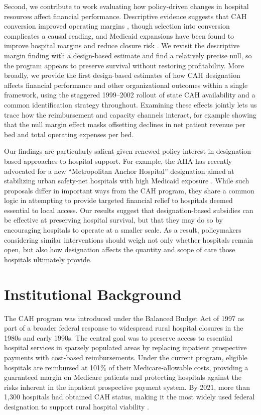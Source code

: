 \documentclass[a4paper, 12pt, twoside]{article}
\begin{document}
Second, we contribute to work evaluating how policy-driven changes in hospital resources affect financial performance. Descriptive evidence suggests that CAH conversion improved operating margins \citep{stensland2003, li2009}, though selection into conversion complicates a causal reading, and Medicaid expansions have been found to improve hospital margins and reduce closure risk \citep{blavin2016, lindrooth2018, blavin2021}. We revisit the descriptive margin finding with a design-based estimate and find a relatively precise null, so the program appears to preserve survival without restoring profitability. More broadly, we provide the first design-based estimates of how CAH designation affects financial performance and other organizational outcomes within a single framework, using the staggered 1999--2002 rollout of state CAH availability and a common identification strategy throughout. Examining these effects jointly lets us trace how the reimbursement and capacity channels interact, for example showing that the null margin effect masks offsetting declines in net patient revenue per bed and total operating expenses per bed.

Our findings are particularly salient given renewed policy interest in designation-based approaches to hospital support. For example, the AHA has recently advocated for a new ``Metropolitan Anchor Hospital'' designation aimed at stabilizing urban safety-net hospitals with high Medicaid exposure \citep{hartzman2022}. While such proposals differ in important ways from the CAH program, they share a common logic in attempting to provide targeted financial relief to hospitals deemed essential to local access. Our results suggest that designation-based subsidies can be effective at preserving hospital survival, but that they may do so by encouraging hospitals to operate at a smaller scale. As a result, policymakers considering similar interventions should weigh not only whether hospitals remain open, but also how designation affects the quantity and scope of care those hospitals ultimately provide.

\section{Institutional Background}
\label{sec:background}

The CAH program was introduced under the Balanced Budget Act of 1997 as part of a broader federal response to widespread rural hospital closures in the 1980s and early 1990s. The central goal was to preserve access to essential hospital services in sparsely populated areas by replacing inpatient prospective payments with cost-based reimbursements. Under the current program, eligible hospitals are reimbursed at 101\% of their Medicare-allowable costs, providing a guaranteed margin on Medicare patients and protecting hospitals against the risks inherent in the inpatient prospective payment system. By 2021, more than 1,300 hospitals had obtained CAH status, making it the most widely used federal designation to support rural hospital viability \citep{crs2023}.
\end{document}
